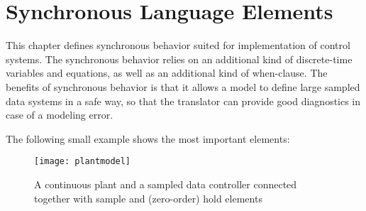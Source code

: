 \chapter{Synchronous Language Elements}\label{synchronous-language-elements}

This chapter defines synchronous
behavior suited for implementation of control systems.
The synchronous behavior relies on an additional kind of discrete-time
variables and equations, as well as an additional kind of when-clause.
The benefits of synchronous behavior is that it allows a model to define large
sampled data systems in a safe way, so that the
translator can provide good diagnostics in case of a modeling error.

The following small example shows the most important elements:
\begin{figure}[H]
\caption{A continuous plant and a sampled data controller connected
together with sample and (zero-order) hold elements}
\begin{center}
\texttt{[image: plantmodel]}
\end{center}
\end{figure}

